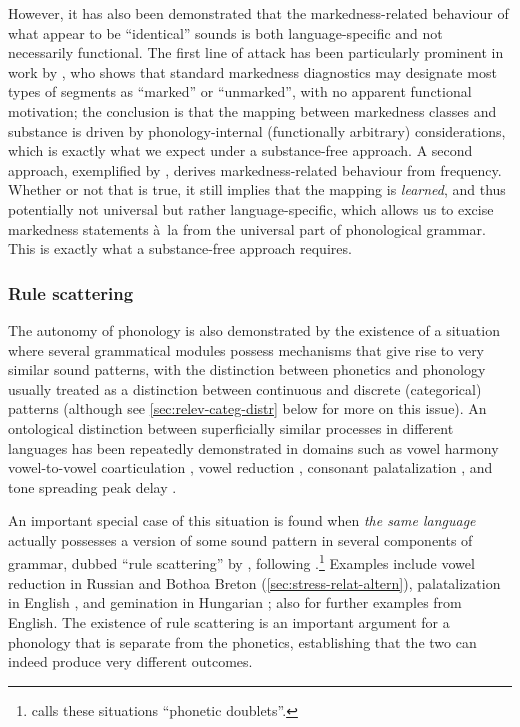However, it has also been demonstrated that the markedness\hyp related behaviour of what appear to be \enquote{identical} sounds is both language\hyp specific and not necessarily functional. The first line of attack has been particularly prominent in work by \citet{rice92,rice94:_laryn_athap,rice96:_defaul_variab,rice03:_featur,rice07:_marked,rice11:_what}, who shows that standard markedness diagnostics may designate most types of segments as \enquote{marked} or \enquote{unmarked}, with no apparent functional motivation; the conclusion is that the mapping between markedness classes and substance is driven by phonology\hyp internal (\ie functionally arbitrary) considerations, which is exactly what we expect under a substance\hyp free approach. A second approach, exemplified \eg by \citet[\emph{et passim}]{hume04:_decon}, derives markedness\hyp related behaviour from frequency. Whether or not that is true, it still implies that the mapping is \emph{learned}, and thus potentially not universal but rather language\hyp specific, which allows us to excise markedness statements à~la \citet[ch.~9]{spe} from the universal part of phonological grammar. This is exactly what a substance\hyp free approach requires.

\subsubsection{Rule scattering}
\label{sec:rule-scattering}

The autonomy of phonology is also demonstrated by the existence of a situation where several grammatical modules possess mechanisms that give rise to very similar sound patterns, with the distinction between phonetics and phonology usually treated as a distinction between continuous and discrete (categorical) patterns (although see \cref{sec:relev-categ-distr} below for more on this issue). An ontological distinction between superficially similar processes in different languages has been repeatedly demonstrated in domains such as vowel harmony \vs vowel\hyp to\hyp vowel coarticulation \citep[\egm][]{przezdziecki05:_vowel_yorub}, vowel reduction \citep{barnesbook,kingston07}, consonant palatalization \citep{zsiga95:_americ_englis,zsiga00:_phonet}, and tone spreading \vs peak delay \citep{myers-phonoknowledge}.

An important special case of this situation is found when \emph{the same language} actually possesses a version of some sound pattern in several components of grammar, dubbed \enquote{rule scattering} by \citet{bermudez-otero10:_curren_englis}, following  \citet{robinson76:_scatt_rule_swiss_german}.\footnote{\citet{cohn98} calls these situations \enquote{phonetic doublets}.} Examples include vowel reduction in Russian \citep{barnesbook,barnes2007,iosad10:_motiv} and Bothoa Breton (\cref{sec:stress-relat-altern}), palatalization in English \citep{zsiga95:_americ_englis}, and gemination in Hungarian \citep{pycha09:_lengt,pycha10}; \cf also \citet{bermudez-otero10:_curren_englis} for further examples from English. The existence of rule scattering is an important argument for a phonology that is separate from the phonetics, establishing that the two can indeed produce very different outcomes.

